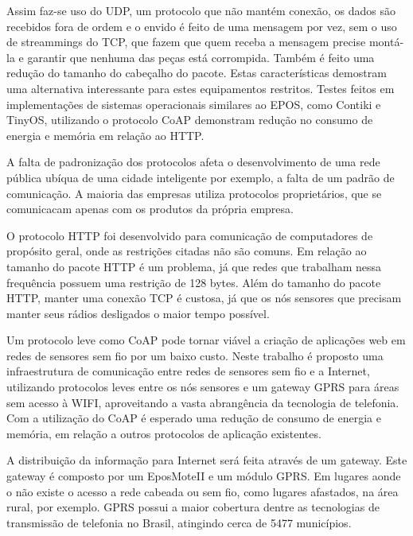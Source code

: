 Assim faz-se uso do UDP, um protocolo que n\~ao mant\'em conex\~ao, os dados s\~ao recebidos fora de ordem e o envido \'e feito de uma mensagem por vez, sem o uso de streammings do TCP, que fazem que quem receba a mensagem precise mont\'a-la e garantir que nenhuma das pe\c{c}as est\'a corrompida. Tamb\'em \'e feito uma redu\c{c}\~ao do tamanho do cabe\c{c}alho do pacote. Estas caracter\'isticas demostram uma alternativa interessante para estes equipamentos restritos. Testes feitos em implementa\c{c}\~oes de sistemas operacionais similares ao EPOS, como Contiki e TinyOS, utilizando o protocolo CoAP demonstram redu\c{c}\~ao no consumo de energia e mem\'oria em rela\c{c}\~ao ao HTTP.\cite{}

A falta de padroniza\c{c}\~ao dos protocolos afeta o desenvolvimento de uma rede p\'ublica ub\'iqua de uma cidade inteligente por exemplo, a falta de um padr\~ao de comunica\c{c}\~ao. A maioria das empresas utiliza protocolos propriet\'arios, que se comunicacam apenas com os produtos da pr\'opria empresa.

O protocolo HTTP foi desenvolvido para comunica\c{c}\~ao de computadores de prop\'osito geral, onde as restri\c{c}\~oes citadas n\~ao s\~ao comuns. Em rela\c{c}\~ao ao tamanho do pacote HTTP \'e um problema, j\'a que redes que trabalham nessa frequ\^encia possuem uma restri\c{c}\~ao de 128 bytes.  Al\'em do tamanho do pacote HTTP, manter uma conex\~ao TCP \'e custosa, j\'a que os n\'os sensores que precisam manter seus r\'adios desligados o maior tempo poss\'ivel.

Um protocolo leve como CoAP pode tornar vi\'avel a cria\c{c}\~ao de aplica\c{c}\~oes web em redes de sensores sem fio por um baixo custo. Neste trabalho \'e proposto uma infraestrutura de comunica\c{c}\~ao entre redes de sensores sem fio e a Internet, utilizando protocolos leves entre os n\'os sensores e um gateway GPRS para \'areas sem acesso \`a WIFI, aproveitando a vasta abrang\^encia da tecnologia de telefonia. Com a utiliza\c{c}\~ao do CoAP \'e esperado uma redu\c{c}\~ao de consumo de energia e mem\'oria, em rela\c{c}\~ao a outros protocolos de aplica\c{c}\~ao existentes.

A distribui\c{c}\~ao da informa\c{c}\~ao para Internet ser\'a feita atrav\'es de um gateway. Este gateway \'e composto por um EposMoteII e um m\'odulo GPRS. Em lugares aonde o n\~ao existe o acesso a rede cabeada ou sem fio, como lugares afastados, na \'area rural, por exemplo. GPRS possui a maior cobertura dentre as tecnologias de transmiss\~ao de telefonia no Brasil, atingindo cerca de 5477 munic\'ipios.

